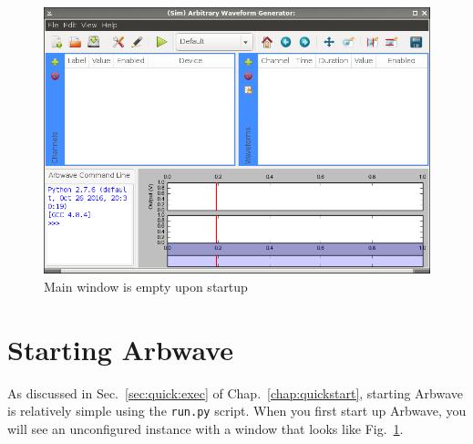 \thispagestyle{fancy}
\pagestyle{fancy}


\begin{figure}[hb!]
  \centerline{\includegraphics[width=.8\textwidth]{figures/main-empty}}
  \caption{Main window is empty upon startup}
  \label{fig:quick:main-empty}
\end{figure}



\section{Starting Arbwave}
As discussed in Sec.~\ref{sec:quick:exec} of Chap.~\ref{chap:quickstart},
starting Arbwave is relatively simple using the \verb|run.py| script.
When you first start up Arbwave, you will see an unconfigured instance with a
window that looks like Fig.~\ref{fig:quick:main-empty}.

